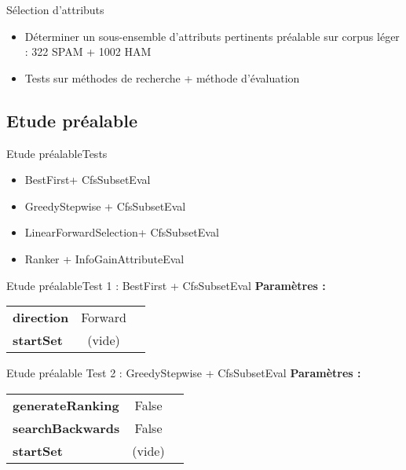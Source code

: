 \begin{frame} {Sélection d'attributs}
	\begin{itemize}
		\item Déterminer un sous-ensemble d'attributs pertinents 
		\pause
		 préalable sur corpus léger : 322 SPAM + 1002 HAM
		\pause
		\item Tests sur méthodes de recherche + méthode d'évaluation
	\end{itemize}
\end{frame}

\subsection{Etude préalable}
\begin{frame} {Etude préalable}{Tests}
	\begin{itemize}
		\item BestFirst+ CfsSubsetEval
		\pause
		\item GreedyStepwise + CfsSubsetEval
		\pause
		\item LinearForwardSelection+ CfsSubsetEval
		\pause
		\item Ranker + InfoGainAttributeEval
	\end{itemize}
\end{frame}

\begin{frame} {Etude préalable}{Test 1 : BestFirst + CfsSubsetEval}
\textbf{Paramètres :}
	\begin{center}
		\begin{tabular}{l cc}
			\textbf{direction} & Forward \\
			\textbf{startSet} & (vide) \\
		\end{tabular}
	\end{center}
\end{frame}

\begin{frame}{Etude préalable} {Test 2 : GreedyStepwise + CfsSubsetEval}
\textbf{Paramètres :}
	\begin{center}
		\begin{tabular} {l cc}
				\textbf{generateRanking} & False \\
				\textbf{searchBackwards} & False \\
				\textbf{startSet} & (vide)\\
		\end{tabular}
	\end{center}
\end{frame}

